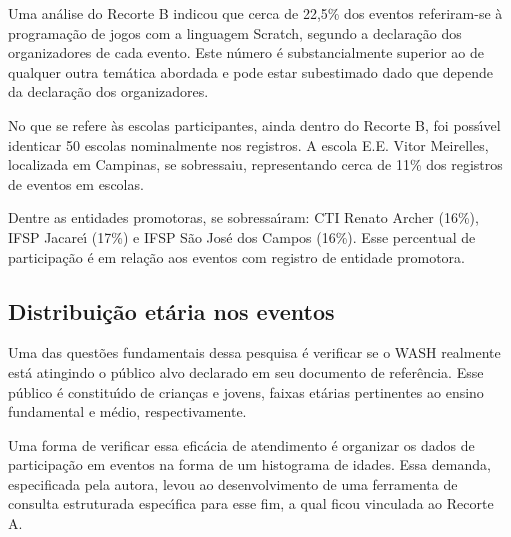 \documentclass[
12pt,		%
openright,	%
twoside,  %
a4paper,			%
chapter=TITLE,		%
english,			%
french,				%
spanish,			%
brazil				%
]{USPSC-classe/USPSC}
\begin{document}
Uma an\'alise do Recorte B indicou que cerca de 22,5\% dos eventos referiram-se \`a programa\c{c}\~ao de jogos com a linguagem Scratch, segundo a declara\c{c}\~ao dos organizadores de cada evento. Este n\'umero \'e substancialmente superior ao de qualquer outra tem\'atica abordada e pode estar subestimado dado que depende da declara\c{c}\~ao dos organizadores.








No que se refere \`as escolas participantes, ainda dentro do Recorte B, foi poss\'{\i}vel identicar 50 escolas nominalmente nos registros. A escola E.E. Vitor Meirelles,  localizada em Campinas, se sobressaiu, representando cerca de 11\% dos registros de eventos em escolas.








Dentre as entidades promotoras, se sobressa\'{\i}ram: CTI Renato Archer (16\%), IFSP Jacare\'{\i} (17\%) e IFSP S\~ao Jos\'e dos Campos (16\%). Esse percentual de participa\c{c}\~ao \'e em rela\c{c}\~ao aos eventos com registro de entidade promotora.








\subsection[Distribui\c{c}\~ao et\'aria nos eventos]{Distribui\c{c}\~ao et\'aria nos eventos}\label{Distribui\c{c}\~ao et\'aria nos eventos}
Uma das quest\~oes fundamentais dessa pesquisa \'e verificar se o WASH realmente est\'a atingindo o p\'ublico alvo declarado em seu documento de refer\^encia. Esse p\'ublico \'e constitu\'{\i}do de crian\c{c}as e jovens, faixas et\'arias pertinentes ao ensino fundamental e m\'edio, respectivamente.








Uma forma de verificar essa efic\'acia de atendimento \'e organizar os dados de participa\c{c}\~ao em eventos na forma de um histograma de idades. Essa demanda, especificada pela autora, levou ao desenvolvimento de uma ferramenta de consulta estruturada espec\'{\i}fica para esse fim, a qual ficou vinculada ao Recorte A.
\end{document}
